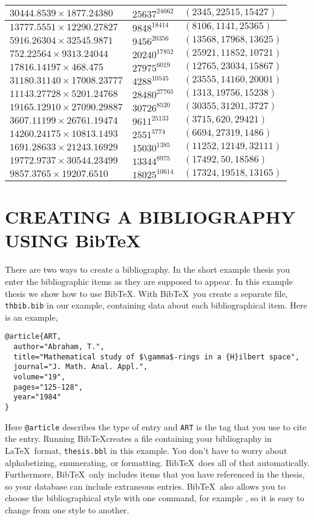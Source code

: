 \begin{longtable}{|l|l|l|}
$30444.8539 \times 1877.24380$ & $25637^{24662}$ & $(2345,22515,15427)$ \\ \hline
$13777.5551 \times 12290.27827$ & $9848^{18414}$ & $(8106,1141,25365)$ \\ \hline$5916.26304 \times 32545.9871$ & $9456^{20356}$ & $(13568,17968,13625)$ \\ \hline
$752.22564 \times 9313.24044$ & $20240^{17852}$ & $(25921,11852,10721)$ \\ \hline
$17816.14197 \times 468.475$ & $27975^{6019}$ & $(12765,23034,15867)$ \\ \hline
$31180.31140 \times 17008.23777$ & $4288^{10545}$ & $(23555,14160,20001)$ \\ \hline
$11143.27728 \times 5201.24768$ & $28480^{27765}$ & $(1313,19756,15238)$ \\ \hline
$19165.12910 \times 27090.29887$ & $30726^{8520}$ & $(30355,31201,3727)$ \\ \hline
$3607.11199 \times 26761.19474$ & $9611^{25133}$ & $(3715,620,29421)$ \\ \hline
$14260.24175 \times 10813.1493$ & $2551^{5774}$ & $(6694,27319,1486)$ \\ \hline
$1691.28633 \times 21243.16929$ & $15030^{1385}$ & $(11252,12149,32111)$ \\ \hline
$19772.9737 \times 30544.23499$ & $13344^{8975}$ & $(17492,50,18586)$ \\ \hline
$9857.3765 \times 19207.6510$ & $18025^{10614}$ & $(17324,19518,13165)$

\end{longtable}


\chapter{CREATING A BIBLIOGRAPHY USING {\sc Bib}{\TeX} }
\label{c:biblio}
There are two ways to create a bibliography.  In the short example
thesis you enter the bibliographic items as they are supposed to
appear.  In this example thesis we show how to use {\sc Bib}\TeX.
With {\sc Bib}\TeX\ you create a separate file, {\tt thbib.bib} in our
example, containing data about each bibliographical item.
Here is an example,
\begin{verbatim}
@article{ART,
  author="Abraham, T.",
  title="Mathematical study of $\gamma$-rings in a {H}ilbert space",
  journal="J. Math. Anal. Appl.",
  volume="19",
  pages="125-128",
  year="1984"
}
\end{verbatim}
Here {\tt @article} describes the type of entry and {\tt ART} is the
tag that you use to cite the entry.
Running {\sc Bib}\TeX creates a file containing your bibliography in
\LaTeX\ format, {\tt thesis.bbl} in this example.  
You don't have to worry about alphabetizing,
enumerating, or  formatting. {\sc Bib}\TeX\ does all of that
automatically.  Furthermore, {\sc Bib}\TeX\ only includes items that
you have referenced in the thesis, so your database can include
extraneous entries.  {\sc Bib}\TeX\ also allows you to choose the 
bibliographical style  with one command, for example
{\tt \verb++}, so it is easy to change from
one style to another.

